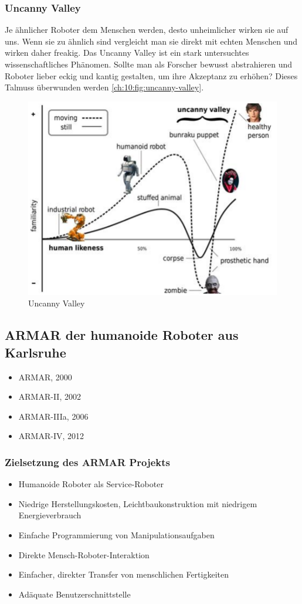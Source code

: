 \subsubsection{Uncanny Valley}
Je ähnlicher Roboter dem Menschen werden, desto unheimlicher wirken sie auf uns.
Wenn sie zu ähnlich sind vergleicht man sie direkt mit echten Menschen und wirken daher freakig. Das Uncanny Valley ist ein stark untersuchtes wissenschaftliches Phänomen.
Sollte man als Forscher bewusst abstrahieren und Roboter lieber eckig und kantig gestalten, um ihre Akzeptanz zu erhöhen?
Dieses \glqq Tal\grqq  muss überwunden werden \autoref{ch:10:fig:uncanny-valley}.
\begin{figure}
	\centering
	\includegraphics[width=.5\textwidth]{figures/uncanny_valley.png}
	\caption{Uncanny Valley}
	\label{ch:10:fig:uncanny-valley}
\end{figure}

\subsection{ARMAR der humanoide Roboter aus Karlsruhe}
\begin{itemize}
	\item ARMAR, 2000
	\item ARMAR-II, 2002
	\item ARMAR-IIIa, 2006
	\item ARMAR-IV, 2012
\end{itemize}

\subsubsection{Zielsetzung des ARMAR Projekts}
\begin{itemize}
	\item Humanoide Roboter als Service-Roboter
	\item Niedrige Herstellungskosten, Leichtbaukonstruktion mit niedrigem Energieverbrauch
	\item Einfache Programmierung von Manipulationsaufgaben
	\item Direkte Mensch-Roboter-Interaktion
	\item Einfacher, direkter Transfer von menschlichen Fertigkeiten
	\item Adäquate Benutzerschnittstelle
\end{itemize}

